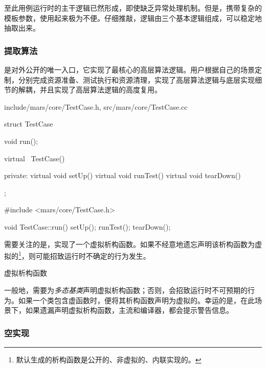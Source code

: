 \begin{content}
至此用例运行时的主干逻辑已然形成，即使缺乏异常处理机制。但是，携带复杂的模板参数，使用起来极为不便。仔细推敲，逻辑由三个基本逻辑组成，可以稳定地抽取出来。

\begin{enum}
\end{enum}

\subsubsection{提取算法}

是对外公开的唯一入口，它实现了最核心的高层算法逻辑。用户根据自己的场景定制，分别完成资源准备、测试执行和资源清理，实现了高层算法逻辑与底层实现细节的解耦，并且实现了高层算法逻辑的高度复用。

\begin{diff}{include/mars/core/TestCase.h, src/mars/core/TestCase.cc}
 \begin{minicpp}
struct TestCase {
  void run();

  virtual ~TestCase() {}

private:
  virtual void setUp() {}
  virtual void runTest() {}
  virtual void tearDown() {}
};
  \end{minicpp}
\tcblower
 \begin{minicpp}
#include <mars/core/TestCase.h>

void TestCase::run() {
  setUp();
  runTest();
  tearDown();
}
  \end{minicpp}
\end{diff}

需要关注的是，实现了一个虚拟析构函数。如果不经意地遗忘声明该析构函数为虚拟的\footnote{默认生成的析构函数是公开的、非虚拟的、内联实现的。}，则可能招致运行时不确定的行为发生。

\begin{episode}{虚拟析构函数}
\begin{content}

一般地，需要为\emph{多态基类}声明虚拟析构函数；否则，会招致运行时不可预期的行为。如果一个类包含虚函数时，便将其析构函数声明为虚拟的。幸运的是，在此场景下，如果遗漏声明虚拟析构函数，主流和\cpp{}编译器，都会提示警告信息。

\subsubsection{空实现}


\end{content}
\end{episode}
\end{content}
